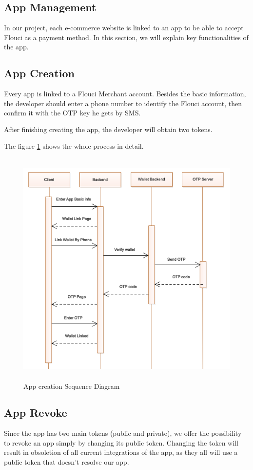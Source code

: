 \begin{spacing}{1.2}
\section{App Management}
In our project, each e-commerce website is linked to an app to be able to accept Flouci as a payment method.
In this section, we will explain key functionalities of the app.
\subsection{App Creation}
Every app is linked to a Flouci Merchant account. Besides the basic information, the developer should enter a phone number to identify the Flouci account, then confirm it with the OTP key he gets by SMS.

After finishing creating the app, the developer will obtain two tokens.

The figure \ref{fig:appcreate} shows the whole process in detail.
\begin{figure}[H]\centering
\includegraphics[width=\textwidth,height=12cm]{Create_App_Sequence_Diagram.png}
\caption{App creation Sequence Diagram}
\label{fig:appcreate}
\end{figure}
\subsection{App Revoke}
Since the app has two main tokens (public and private), we offer the possibility to revoke an app simply by changing its public token. Changing the token will result in obsoletion of all current integrations of the app, as they all will use a public token that doesn't resolve our app.


\end{spacing}
